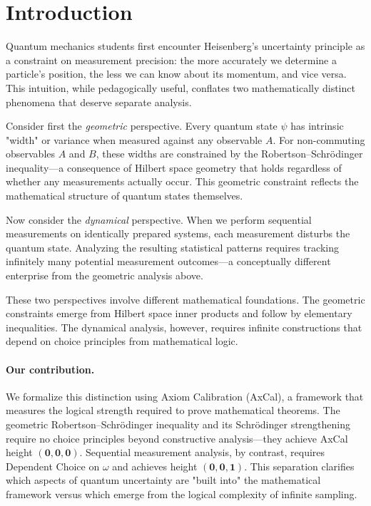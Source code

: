 \documentclass[11pt]{article}
\theoremstyle{plain}
\theoremstyle{definition}
\theoremstyle{remark}
\begin{document}
\section{Introduction}

Quantum mechanics students first encounter Heisenberg's uncertainty principle as a constraint on measurement precision: the more accurately we determine a particle's position, the less we can know about its momentum, and vice versa. This intuition, while pedagogically useful, conflates two mathematically distinct phenomena that deserve separate analysis.

Consider first the \emph{geometric} perspective. Every quantum state $\psi$ has intrinsic "width" or variance when measured against any observable $A$. For non-commuting observables $A$ and $B$, these widths are constrained by the Robertson--Schrödinger inequality---a consequence of Hilbert space geometry that holds regardless of whether any measurements actually occur. This geometric constraint reflects the mathematical structure of quantum states themselves.

Now consider the \emph{dynamical} perspective. When we perform sequential measurements on identically prepared systems, each measurement disturbs the quantum state. Analyzing the resulting statistical patterns requires tracking infinitely many potential measurement outcomes---a conceptually different enterprise from the geometric analysis above.

These two perspectives involve different mathematical foundations. The geometric constraints emerge from Hilbert space inner products and follow by elementary inequalities. The dynamical analysis, however, requires infinite constructions that depend on choice principles from mathematical logic.

\paragraph{Our contribution.}
We formalize this distinction using Axiom Calibration (AxCal), a framework that measures the logical strength required to prove mathematical theorems. The geometric Robertson--Schrödinger inequality and its Schrödinger strengthening require no choice principles beyond constructive analysis---they achieve AxCal height $(\mathbf{0},\mathbf{0},\mathbf{0})$. Sequential measurement analysis, by contrast, requires Dependent Choice on $\omega$ and achieves height $(\mathbf{0},\mathbf{0},\mathbf{1})$. This separation clarifies which aspects of quantum uncertainty are "built into" the mathematical framework versus which emerge from the logical complexity of infinite sampling.
\end{document}
